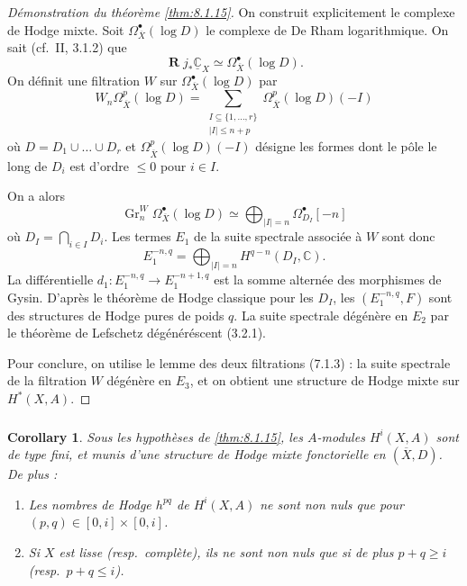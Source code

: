 \documentclass[11pt]{amsart}
\theoremstyle{plain}
\newtheorem{corollary}[theorem]{Corollary}
\theoremstyle{definition}
\DeclareMathOperator{\Gr}{Gr}
\DeclareMathOperator{\Rd}{\mathbf{R}}
\newcommand{\CC}{\mathbb{C}}
\begin{document}
\subsubsection{}
\begin{proof}[D\'emonstration du th\'eor\`eme \ref{thm:8.1.15}]
On construit explicitement le complexe de Hodge mixte. Soit $\Omega_{\overline{X}}^\bullet(\log D)$ le complexe de De Rham logarithmique. On sait (cf.\ II, 3.1.2) que
\[
\Rd j_* \underline{\CC}_X \simeq \Omega_{\overline{X}}^\bullet(\log D).
\]
On d\'efinit une filtration $W$ sur $\Omega_{\overline{X}}^\bullet(\log D)$ par
\[
W_n \Omega_{\overline{X}}^p(\log D) = \sum_{\substack{I \subseteq \{1,\ldots,r\} \\ |I| \leq n+p}} \Omega_{\overline{X}}^p(\log D)(-I)
\]
o\`u $D = D_1 \cup \ldots \cup D_r$ et $\Omega_{\overline{X}}^p(\log D)(-I)$ d\'esigne les formes dont le p\^ole le long de $D_i$ est d'ordre $\leq 0$ pour $i \in I$.

On a alors
\[
\Gr_n^W \Omega_{\overline{X}}^\bullet(\log D) \simeq \bigoplus_{|I| = n} \Omega_{D_I}^\bullet[-n]
\]
o\`u $D_I = \bigcap_{i \in I} D_i$. Les termes $E_1$ de la suite spectrale associ\'ee \`a $W$ sont donc
\[
E_1^{-n,q} = \bigoplus_{|I|=n} H^{q-n}(D_I, \CC).
\]
La diff\'erentielle $d_1 : E_1^{-n,q} \to E_1^{-n+1,q}$ est la somme altern\'ee des morphismes de Gysin. D'apr\`es le th\'eor\`eme de Hodge classique pour les $D_I$, les $(E_1^{-n,q}, F)$ sont des structures de Hodge pures de poids $q$. La suite spectrale d\'eg\'en\`ere en $E_2$ par le th\'eor\`eme de Lefschetz d\'eg\'en\'er\'escent (3.2.1).

Pour conclure, on utilise le lemme des deux filtrations (7.1.3) : la suite spectrale de la filtration $W$ d\'eg\'en\`ere en $E_3$, et on obtient une structure de Hodge mixte sur $H^*(X, A)$.
\end{proof}

\subsubsection{}
\begin{corollary}
Sous les hypoth\`eses de \ref{thm:8.1.15}, les $A$-modules $H^i(X, A)$ sont de type fini, et munis d'une structure de Hodge mixte fonctorielle en $(\overline{X}, D)$. De plus :
\begin{enumerate}
\item[(i)] Les nombres de Hodge $h^{pq}$ de $H^i(X, A)$ ne sont non nuls que pour $(p,q) \in [0,i] \times [0,i]$.
\item[(ii)] Si $X$ est lisse (resp.\ compl\`ete), ils ne sont non nuls que si de plus $p+q \geq i$ (resp.\ $p+q \leq i$).
\end{enumerate}
\end{corollary}
\end{document}

